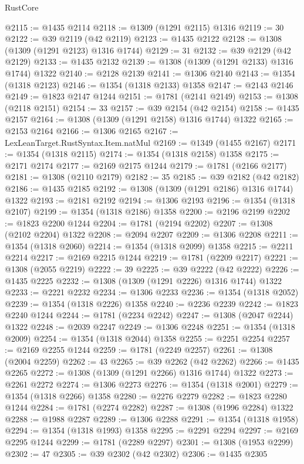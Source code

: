 \begin{lexlean}{RustCore}
\begin{coremodule}
@2115 := @1435 @2114
@2118 := @1309 (@1291 @2115) @1316
@2119 := 30
@2122 := @39 @2119 (@42 @2119)
@2123 := @1435 @2122
@2128 := @1308 (@1309 (@1291 @2123) @1316 @1744)
@2129 := 31
@2132 := @39 @2129 (@42 @2129)
@2133 := @1435 @2132
@2139 := @1308 (@1309 (@1291 @2133) @1316 @1744) @1322
@2140 := @2128 @2139
@2141 := @1306 @2140
@2143 := @1354 (@1318 @2123)
@2146 := @1354 (@1318 @2133) @1358
@2147 := @2143 @2146
@2149 := @1823 @2147 @1244
@2151 := @1781 (@2141 @2149)
@2153 := @1308 (@2118 @2151)
@2154 := 33
@2157 := @39 @2154 (@42 @2154)
@2158 := @1435 @2157
@2164 := @1308 (@1309 (@1291 @2158) @1316 @1744) @1322
@2165 := @2153 @2164
@2166 := @1306 @2165
@2167 := LexLeanTarget.RustSyntax.Item.natMul
@2169 := @1349 (@1455 @2167)
@2171 := @1354 (@1318 @2115)
@2174 := @1354 (@1318 @2158) @1358
@2175 := @2171 @2174
@2177 := @2169 @2175 @1244
@2179 := @1781 (@2166 @2177)
@2181 := @1308 (@2110 @2179)
@2182 := 35
@2185 := @39 @2182 (@42 @2182)
@2186 := @1435 @2185
@2192 := @1308 (@1309 (@1291 @2186) @1316 @1744) @1322
@2193 := @2181 @2192
@2194 := @1306 @2193
@2196 := @1354 (@1318 @2107)
@2199 := @1354 (@1318 @2186) @1358
@2200 := @2196 @2199
@2202 := @1823 @2200 @1244
@2204 := @1781 (@2194 @2202)
@2207 := @1308 (@2102 @2204) @1322
@2208 := @2094 @2207
@2209 := @1306 @2208
@2211 := @1354 (@1318 @2060)
@2214 := @1354 (@1318 @2099) @1358
@2215 := @2211 @2214
@2217 := @2169 @2215 @1244
@2219 := @1781 (@2209 @2217)
@2221 := @1308 (@2055 @2219)
@2222 := 39
@2225 := @39 @2222 (@42 @2222)
@2226 := @1435 @2225
@2232 := @1308 (@1309 (@1291 @2226) @1316 @1744) @1322
@2233 := @2221 @2232
@2234 := @1306 @2233
@2236 := @1354 (@1318 @2052)
@2239 := @1354 (@1318 @2226) @1358
@2240 := @2236 @2239
@2242 := @1823 @2240 @1244
@2244 := @1781 (@2234 @2242)
@2247 := @1308 (@2047 @2244) @1322
@2248 := @2039 @2247
@2249 := @1306 @2248
@2251 := @1354 (@1318 @2009)
@2254 := @1354 (@1318 @2044) @1358
@2255 := @2251 @2254
@2257 := @2169 @2255 @1244
@2259 := @1781 (@2249 @2257)
@2261 := @1308 (@2004 @2259)
@2262 := 43
@2265 := @39 @2262 (@42 @2262)
@2266 := @1435 @2265
@2272 := @1308 (@1309 (@1291 @2266) @1316 @1744) @1322
@2273 := @2261 @2272
@2274 := @1306 @2273
@2276 := @1354 (@1318 @2001)
@2279 := @1354 (@1318 @2266) @1358
@2280 := @2276 @2279
@2282 := @1823 @2280 @1244
@2284 := @1781 (@2274 @2282)
@2287 := @1308 (@1996 @2284) @1322
@2288 := @1988 @2287
@2289 := @1306 @2288
@2291 := @1354 (@1318 @1958)
@2294 := @1354 (@1318 @1993) @1358
@2295 := @2291 @2294
@2297 := @2169 @2295 @1244
@2299 := @1781 (@2289 @2297)
@2301 := @1308 (@1953 @2299)
@2302 := 47
@2305 := @39 @2302 (@42 @2302)
@2306 := @1435 @2305

\end{coremodule}
\end{lexlean}

